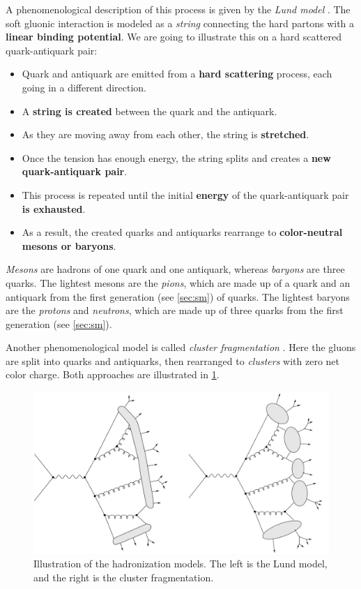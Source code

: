 A phenomenological description of this process is given by the \emph{Lund model} \cite{lund}.
The soft gluonic interaction is modeled as a \emph{string} connecting the hard partons with a \textbf{linear binding potential}.
We are going to illustrate this on a hard scattered quark-antiquark pair:
\begin{itemize}
    \item Quark and antiquark are emitted from a \textbf{hard scattering} process, each going in a different direction.
    \item A \textbf{string is created} between the quark and the antiquark.
    \item As they are moving away from each other, the string is \textbf{stretched}.
    \item Once the tension has enough energy, the string splits and creates a \textbf{new quark-antiquark pair}.
    \item This process is repeated until the initial \textbf{energy} of the quark-antiquark pair \textbf{is exhausted}.
    \item As a result, the created quarks and antiquarks rearrange to \textbf{color-neutral mesons or baryons}.
\end{itemize}
\emph{Mesons} are hadrons of one quark and one antiquark, whereas \emph{baryons} are three quarks.
The lightest mesons are the \emph{pions}, which are made up of a quark and an antiquark from the first generation (see \cref{sec:sm}) of quarks.
The lightest baryons are the \emph{protons} and \emph{neutrons}, which are made up of three quarks from the first generation (see \cref{sec:sm}).

Another phenomenological model is called \emph{cluster fragmentation} \cite{cluster_frag}.
Here the gluons are split into quarks and antiquarks, then rearranged to \emph{clusters} with zero net color charge.
Both approaches are illustrated in \cref{fig:hadronization}.
\begin{figure}[htb]
    \centering
    \includegraphics[width=1.\linewidth]{src/img/hadronization.png}
    \caption[Illustration of the hadronization models. The left is the Lund model, and the right is the cluster fragmentation.]{Illustration of the hadronization models. The left is the Lund model, and the right is the cluster fragmentation. \footnotemark}
    \label{fig:hadronization}
\end{figure}


